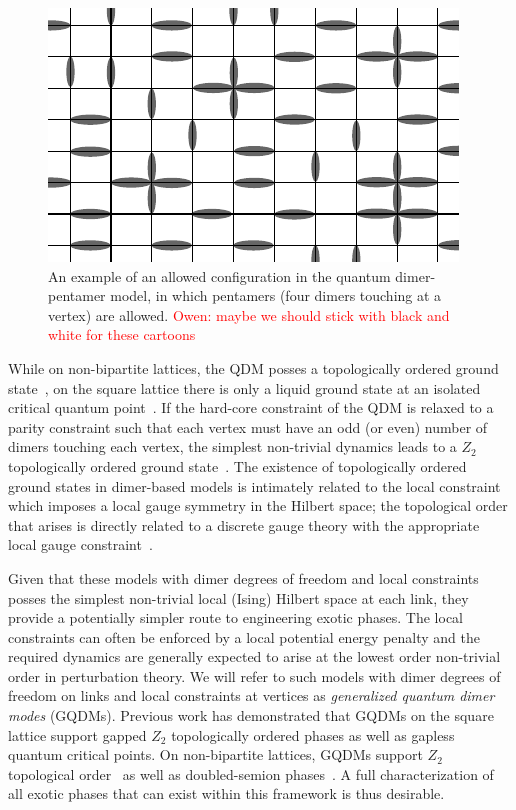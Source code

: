 \documentclass[twocolumn,prb,aps,floatfix,superscriptaddress]{revtex4-1}
\newcommand{\note}[1]{\textcolor{red}{#1}}
\begin{document}
\begin{figure}[t!]
    \centering
    \includegraphics[width=0.75\columnwidth]{QDPM_ex_config.pdf}
    \caption{An example of an allowed configuration in the quantum dimer-pentamer model, in which pentamers (four dimers touching at a vertex) are allowed. \note{Owen: maybe we should stick with black and white for these cartoons}}
    \label{fig:QDPMex}
\end{figure}

While on non-bipartite lattices, the QDM posses a topologically ordered ground state~\cite{Moessner2001a,Fendley2002}, on the square lattice there is only a liquid ground state at an isolated critical quantum point~\cite{Leung1996,Syljuasen2006}. If the hard-core constraint of the QDM is relaxed to a parity constraint such that each vertex must have an odd (or even) number of dimers touching each vertex, the simplest non-trivial dynamics leads to a $Z_2$ topologically ordered ground state~\cite{Kitaev2003,Wen2003}. The existence of topologically ordered ground states in dimer-based models is intimately related to the local constraint which imposes a local gauge symmetry in the Hilbert space; the topological order that arises is directly related to a discrete gauge theory with the appropriate local gauge constraint~\cite{Moessner2001}.

Given that these models with dimer degrees of freedom and local constraints posses the simplest non-trivial local (Ising) Hilbert space at each link, they provide a potentially simpler route to engineering exotic phases. The local constraints can often be enforced by a local potential energy penalty and the required dynamics are generally expected to arise at the lowest order non-trivial order in perturbation theory. We will refer to such models with dimer degrees of freedom on links and local constraints at vertices as \emph{generalized quantum dimer modes} (GQDMs). Previous work has demonstrated that GQDMs on the square lattice support gapped $Z_2$ topologically ordered phases as well as gapless quantum critical points. On non-bipartite lattices, GQDMs support $Z_2$ topological order~\cite{Moessner2001a,Misguich2002} as well as doubled-semion phases~\cite{Qi2014,Buerschaper2014a}. A full characterization of all exotic phases that can exist within this framework is thus desirable.
\end{document}

